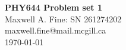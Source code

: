 \documentclass[11pt]{article}
\begin{document}
\begin{center}
    {\Large \textbf{PHY644 Problem set 1}}\\
    Maxwell A. Fine: SN 261274202 \\ 
    maxwell.fine@mail.mcgill.ca \\
    \today
\end{center}





\end{document}
